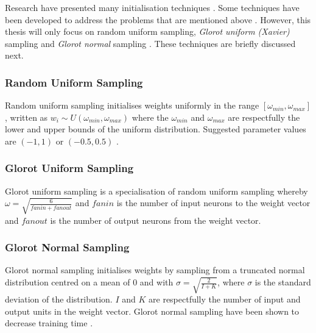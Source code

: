 Research have presented many initialisation techniques \cite{ref:erdogmus:2003}.
Some techniques have been developed to address the problems that are mentioned
above \cite{ref:yadav:2018}. However, this thesis will only focus on
random uniform sampling, \textit{Glorot uniform (Xavier)} sampling and \textit{Glorot normal} sampling \cite{ref:glorot:2010}. These
techniques are briefly discussed next.


\subsubsection{Random Uniform Sampling}
\label{sec:anns:an:weights:random_uniform_sampling}

Random uniform sampling initialises weights
uniformly in the range $[\omega_{min}, \omega_{max}]$, written as $w_{i} \sim
\textit{U} (\omega_{min}, \omega_{max})$ where the $\omega_{min}$ and
$\omega_{max}$ are respectfully the lower and upper bounds of the uniform
distribution. Suggested parameter values are $(-1, 1)$ or $(-0.5, 0.5)$
\cite{ref:nguyen:1990}.


\subsubsection{Glorot Uniform Sampling}
\label{sec:anns:an:weights:glorot_uniform_sampling}

Glorot uniform sampling is a specialisation of
random uniform sampling whereby $\omega =
\sqrt{\frac{6}{fanin + fanout}}$ and $fanin$ is the number of
input neurons to the weight vector and $fanout$ is the number of
output neurons from the weight vector.

\subsubsection{Glorot Normal Sampling}
\label{sec:anns:an:weights:glorot_normal_sampling}

Glorot normal sampling initialises weights by
sampling from a truncated normal distribution centred on a mean of $0$ and with
$\sigma = \sqrt{\frac{2}{I + K}}$, where $\sigma$ is the standard deviation of
the distribution. $I$ and $K$ are respectfully the number of input and output
units in the weight vector. Glorot normal sampling
have been shown to decrease training time \cite{ref:glorot:2010}.  


